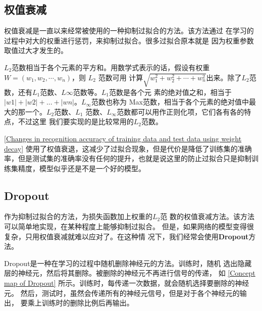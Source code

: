 \subsection{权值衰减}
权值衰减是一直以来经常被使用的一种抑制过拟合的方法。该方法通过
在学习的过程中对大的权重进行惩罚，来抑制过拟合。很多过拟合原本就是
因为权重参数取值过大才发生的。
\begin{tcolorbox}
    $L_2$范数相当于各个元素的平方和。用数学式表示的话，假设有权重
    $W = (w_1, w_2, \cdots , w_n)$，则 $L_2$ 范数可用
    计算$\sqrt{w_1^2+w_2^2+\cdots+w_n^2}$出来。除了$L_2$范数，还有$L_1$范数、$L\infty$范数等。$L_1$范数是各个元
    素的绝对值之和，相当于$|w1| + |w2| + . . . + |wn|$。$L_{\infty}$范数也称为
    Max范数，相当于各个元素的绝对值中最大的那一个。$L_2$范数、$L_1$
    范数、$L_{\infty}$范数都可以用作正则化项，它们各有各的特点，不过这里
    我们要实现的是比较常用的$L_2$范数。
\end{tcolorbox}

\autoref{Changes in recognition accuracy of training data and test data using weight decay} 使用了权值衰退，这减少了过拟合现象，但是代价是降低了训练集的准确率，但是测试集的准确率没有任何的提升，也就是说这里的防止过拟合只是抑制训练集精度，模型似乎还是不是一个好的模型。
\subsection{Dropout}
作为抑制过拟合的方法，为损失函数加上权重的$L_2$范
数的权值衰减方法。该方法可以简单地实现，在某种程度上能够抑制过拟合。
但是，如果网络的模型变得很复杂，只用权值衰减就难以应对了。在这种情
况下，我们经常会使用\textbf{Dropout}方法。

Dropout是一种在学习的过程中随机删除神经元的方法。训练时，随机
选出隐藏层的神经元，然后将其删除。被删除的神经元不再进行信号的传递，
如 \autoref{Concept map of Dropout} 所示。训练时，每传递一次数据，就会随机选择要删除的神经元。
然后，测试时，虽然会传递所有的神经元信号，但是对于各个神经元的输出，
要乘上训练时的删除比例后再输出。


